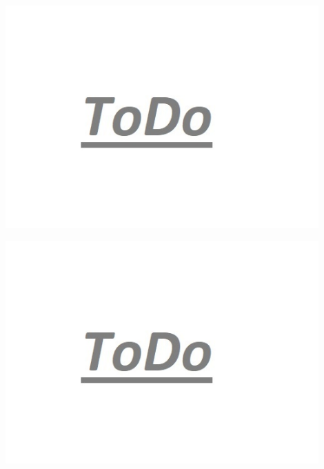 \begin{minipage}{0.48\textwidth}
	\centering
	\includegraphics[width=0.9\textwidth]{images/todo.jpg}
	\label{img:acco-convergence}
\end{minipage}\begin{minipage}{0.48\textwidth}
	\centering
	\includegraphics[width=0.9\textwidth]{images/todo.jpg}
\end{minipage}\\

